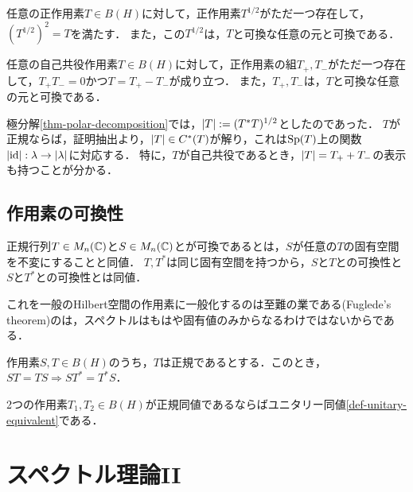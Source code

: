 \documentclass[uplatex,dvipdfmx]{jsreport}
\begin{document}
\begin{proposition}
    任意の正作用素$T\in B(H)$に対して，正作用素$T^{1/2}$がただ一つ存在して，$(T^{1/2})^2=T$を満たす．
    また，この$T^{1/2}$は，$T$と可換な任意の元と可換である．
\end{proposition}

\begin{proposition}
    任意の自己共役作用素$T\in B(H)$に対して，正作用素の組$T_+,T_-$がただ一つ存在して，$T_+T_-=0$かつ$T=T_+-T_-$が成り立つ．
    また，$T_+,T_-$は，$T$と可換な任意の元と可換である．
\end{proposition}

\begin{remark}
    極分解\ref{thm-polar-decomposition}では，$\lvert T\rvert:=(T^*T)^{1/2}$としたのであった．
    $T$が正規ならば，証明抽出より，$\lvert T\rvert\in C^*(T)$が解り，これは$\mathrm{Sp}(T)$上の関数$\lvert\mathrm{id}\rvert:\lambda\to\lvert\lambda\rvert$に対応する．
    特に，$T$が自己共役であるとき，$\lvert T\rvert=T_++T_-$の表示も持つことが分かる．
\end{remark}

\subsection{作用素の可換性}

\begin{discussion}
    正規行列$T\in M_n(\mathbb{C})$と$S\in M_n(\mathbb{C})$とが可換であるとは，$S$が任意の$T$の固有空間を不変にすることと同値．
    $T,T^*$は同じ固有空間を持つから，$S$と$T$との可換性と$S$と$T^*$との可換性とは同値．

    これを一般のHilbert空間の作用素に一般化するのは至難の業である(Fuglede's theorem)のは，スペクトルはもはや固有値のみからなるわけではないからである．
\end{discussion}

\begin{proposition}\label{prop-Fuglede}
    作用素$S,T\in B(H)$のうち，$T$は正規であるとする．このとき，$ST=TS\Rightarrow ST^*=T^*S$．
\end{proposition}

\begin{proposition}
    2つの作用素$T_1,T_2\in B(H)$が正規同値であるならばユニタリー同値\ref{def-unitary-equivalent}である．
\end{proposition}

\section{スペクトル理論II}
\end{document}
